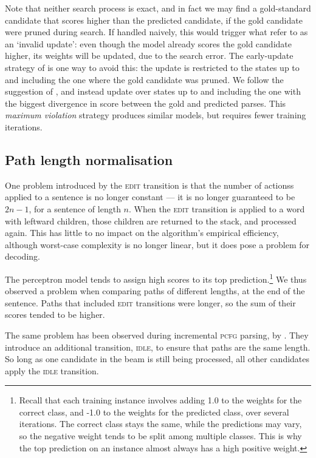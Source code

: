 \documentclass[11pt,letterpaper]{article}
\begin{document}
Note that neither search process is exact, and in fact we may find a gold-standard
candidate that scores higher than the predicted candidate, if the gold candidate
were pruned during search.  If handled naively, this would trigger what \citet{huang:12}
refer to as an `invalid update': even though the model already scores the gold
candidate higher, its weights will be updated, due to the search error. The early-update
strategy of \citet{collins:02} is one way to avoid this: the update is restricted
to the states up to and including the one where the gold candidate was pruned.
We follow the suggestion of \citet{huang:12}, and instead update over states up to
and including the one with the biggest divergence in score between the gold and
predicted parses. This \emph{maximum violation} strategy produces similar models,
but requires fewer training iterations.

\subsection{Path length normalisation}

One problem introduced by the \textsc{edit} transition is that the number of
actionss applied to a sentence is no longer constant --- it is no longer guaranteed
to be $2n-1$, for a sentence of length $n$. When the \textsc{edit} transition is
applied to a word with leftward children, those children are returned to the stack,
and processed again.  This has little to no impact on the algorithm's empirical
efficiency, although worst-case complexity is no longer linear, but it does
pose a problem for decoding.

The perceptron model tends to assign
high scores to its top prediction.\footnote{Recall that each training instance
involves adding 1.0 to the weights for the correct class, and -1.0 to the weights
for the predicted class, over several iterations. The correct class stays the
same, while the predictions may vary, so the negative weight tends to be split
among multiple classes. This is why the top prediction on an instance almost
always has a high positive weight.}
We thus observed a problem when comparing paths of different lengths, at the end
of the sentence. Paths that included \textsc{edit} transitions were longer,
so the sum of their scores tended to be higher.

The same problem has been observed during incremental \textsc{pcfg} parsing,
by \citet{zhang:13}.  They introduce an additional transition, \textsc{idle},
to ensure that paths are the same length. So long as one candidate in the beam
is still being processed, all other candidates apply the \textsc{idle} transition.
\end{document}
